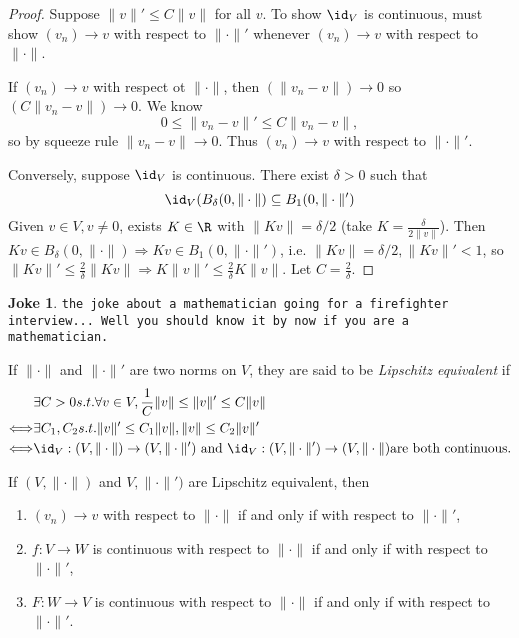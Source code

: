 \documentclass[a4paper]{article}
\theoremstyle{definition}
\newtheorem*{joke}{Joke}
\begin{document}
\begin{proof}
  Suppose \(\|v\|' \leq C \|v\|\) for all \(v\). To show \(\id_V\) is continuous, must show \((v_n)\to v\) with respect to \(\|\cdot\|'\) whenever \((v_n)\to v\) with respect to \(\|\cdot\|\).

  If \((v_n)\to v\) with respect ot \(\|\cdot\|\), then \((\|v_n-v\|)\to 0\) so \((C\|v_n-v\|)\to 0\). We know
  \[
    0 \leq \|v_n-v\|' \leq C \|v_n-v\|,
  \]
  so by squeeze rule \(\|v_n-v\|\to 0\). Thus \((v_n)\to v\) with respect to \(\|\cdot\|'\).

  Conversely, suppose \(\id_V\) is continuous. There exist \(\delta>0\) such that
  \[
    \id_V(B_\delta(0, \|\cdot\|) \subseteq B_1(0, \|\cdot\|')
  \]
  Given \(v \in V, v \neq 0\), exists \(K\in\R\) with \(\|Kv\| = \delta/2\) (take \(K=\frac{\delta}{2 \|v\|}\)). Then \(Kv \in B_\delta(0,\|\cdot\|) \Rightarrow Kv\in B_1(0,\|\cdot\|')\), i.e. \(\|Kv\| = \delta/2, \|Kv\|' < 1\), so \(\|Kv\|' \leq \frac{2}{\delta}\|Kv\| \Rightarrow K \|v\|' \leq \frac{2}{\delta}K \|v\|\). Let \(C = \frac{2}{\delta}\).
\end{proof}

\begin{joke}
  \texttt{the joke about a mathematician going for a firefighter interview... Well you should know it by now if you are a mathematician.}
\end{joke}

\begin{defi}
  If \(\|\cdot\|\) and \(\|\cdot\|'\) are two norms on \(V\), they are said to be \emph{Lipschitz equivalent} if
  \begin{align*}
    & \exists C>0 s.t. \forall v \in V, \frac{1}{C}\|v\| \leq \|v\|' \leq C \|v\| \\
    \Longleftrightarrow & \exists C_1,C_2 s.t. \|v\|' \leq C_1 \|v\|, \|v\| \leq C_2 \|v\|' \\
    \Longleftrightarrow & \id_V:(V,\|\cdot\|)\to (V,\|\cdot\|') \text{ and } \id_V:(V,\|\cdot\|')\to (V,\|\cdot\|) \text{are both continuous.}
  \end{align*}
\end{defi}

\begin{cor}
  If \((V, \|\cdot\|)\) and \(V, \|\cdot\|')\) are Lipschitz equivalent, then
  \begin{enumerate}
  \item \((v_n)\to v\) with respect to \(\|\cdot\|\) if and only if with respect to \(\|\cdot\|'\),
  \item \(f:V\to W\) is continuous with respect to \(\|\cdot\|\) if and only if with respect to \(\|\cdot\|'\),
  \item \(F:W\to V\) is continuous with respect to \(\|\cdot\|\) if and only if with respect to \(\|\cdot\|'\).
  \end{enumerate}
\end{cor}
\end{document}
